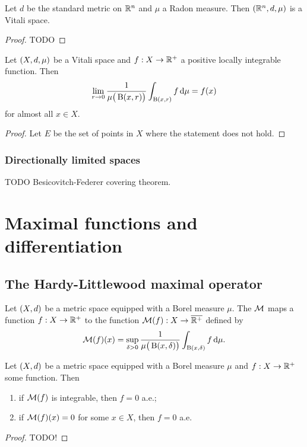 \begin{proposition}
Let $d$ be the standard metric on $\mathbb{R}^n$ and $\mu$ a Radon measure. Then $\left( \mathbb{R}^n, d,\mu \right)$ is a Vitali space.
\end{proposition}
\begin{proof}
TODO
\end{proof}

\begin{theorem}
Let $\left( X,d,\mu \right)$ be a Vitali space and $f: X\to \mathbb{R}^+$ a positive locally integrable function. Then
\[ \lim_{r\to 0} \frac{1}{\mu\big(\operatorname{B}(x, r)\big)}\int_{\operatorname{B}(x, r)}f\operatorname{d \!}{\mu} = f(x) \]
for almost all $x\in X$.
\end{theorem}
\begin{proof}
Let $E$ be the set of points in $X$ where the statement does not hold. 
\end{proof}

\subsubsection{Directionally limited spaces}

TODO Besicovitch-Federer covering theorem.

\section{Maximal functions and differentiation}
\subsection{The Hardy-Littlewood maximal operator}
\begin{definition}
Let $\left( X,d \right)$ be a metric space equipped with a Borel measure $\mu$. The  $\operatorname{\mathcal{M}}$ maps a function $f: X\to \mathbb{R}^+$ to the function $\operatorname{\mathcal{M}}(f): X\to \overline{\mathbb{R}^+}$ defined by
\[ \operatorname{\mathcal{M}}(f)(x) = \sup_{\delta >0}\frac{1}{\mu\big(\operatorname{B}(x,\delta)\big)}\int_{\operatorname{B}(x,\delta)} f \operatorname{d \!}{\mu}. \]
\end{definition}

\begin{proposition}
Let $\left( X,d \right)$ be a metric space equipped with a Borel measure $\mu$ and $f: X\to \mathbb{R}^+$ some function. Then
\begin{enumerate}
\item if $\operatorname{\mathcal{M}}(f)$ is integrable, then $f = 0$ a.e.;
\item if $\operatorname{\mathcal{M}}(f)(x) = 0$ for some $x\in X$, then $f=0$ a.e. 
\end{enumerate}
\end{proposition}
\begin{proof}
TODO!
\end{proof}


